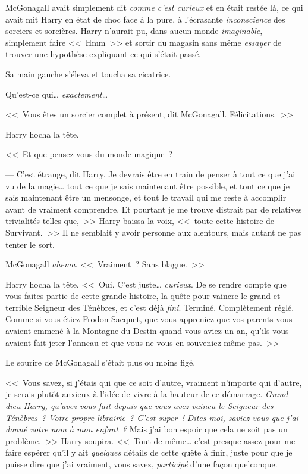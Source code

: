 McGonagall avait simplement dit \emph{comme c'est curieux} et en était restée là, ce qui avait mit Harry en état de choc face à la pure, à l'écrasante \emph{inconscience} des sorciers et sorcières. Harry n'aurait pu, dans aucun monde \emph{imaginable}, simplement faire <<~Hmm~>> et sortir du magasin sans même \emph{essayer} de trouver une hypothèse expliquant ce qui s'était passé.

Sa main gauche s'éleva et toucha sa cicatrice.

Qu'est-ce qui… \emph{exactement}…

<<~Vous êtes un sorcier complet à présent, dit McGonagall. Félicitations.~>>

Harry hocha la tête.

<<~Et que pensez-vous du monde magique~?

--- C'est étrange, dit Harry. Je devrais être en train de penser à tout ce que j'ai vu de la magie… tout ce que je sais maintenant être possible, et tout ce que je sais maintenant être un mensonge, et tout le travail qui me reste à accomplir avant de vraiment comprendre. Et pourtant je me trouve distrait par de relatives trivialités telles que,~>> Harry baissa la voix, <<~toute cette histoire de Survivant.~>> Il ne semblait y avoir personne aux alentours, mais autant ne pas tenter le sort.

McGonagall \emph{ahema}. <<~Vraiment~? Sans blague.~>>

Harry hocha la tête. <<~Oui. C'est juste… \emph{curieux}. De se rendre compte que vous faites partie de cette grande histoire, la quête pour vaincre le grand et terrible Seigneur des Ténèbres, et c'est déjà \emph{fini}. Terminé. Complètement réglé. Comme si vous étiez Frodon Sacquet, que vous appreniez que vos parents vous avaient emmené à la Montagne du Destin quand vous aviez un an, qu'ils vous avaient fait jeter l'anneau et que vous ne vous en souveniez même pas.~>>

Le sourire de McGonagall s'était plus ou moins figé.

<<~Vous savez, si j'étais qui que ce soit d'autre, vraiment n'importe qui d'autre, je serais plutôt anxieux à l'idée de vivre à la hauteur de ce démarrage. \emph{Grand dieu Harry, qu'avez-vous fait depuis que vous avez vaincu le Seigneur des Ténèbres~? Votre propre librairie~? C'est super~! Dites-moi, saviez-vous que j'ai donné votre nom à mon enfant~?} Mais j'ai bon espoir que cela ne soit pas un problème.~>> Harry soupira. <<~Tout de même… c'est presque assez pour me faire espérer qu'il y ait \emph{quelques} détails de cette quête à finir, juste pour que je puisse dire que j'ai vraiment, vous savez, \emph{participé} d'une façon quelconque.

